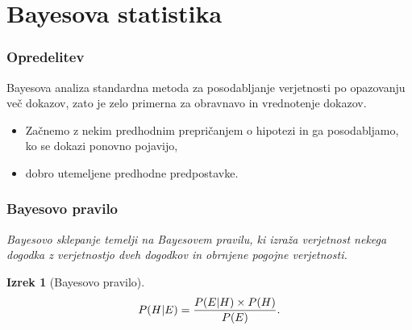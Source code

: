 \documentclass{beamer}
\newtheorem{izrek}{Izrek}
\begin{document}
\section{Bayesova statistika}

\begin{frame}
   \frametitle{Opredelitev}
   \begin{beamerboxesrounded}[]{Bayesova analiza}
      standardna metoda za posodabljanje verjetnosti po opazovanju več dokazov, zato je zelo primerna za obravnavo in vrednotenje 
      dokazov.
   \end{beamerboxesrounded} \vspace{3mm}
   \begin{itemize}
      \item Začnemo z nekim predhodnim prepričanjem o hipotezi in ga posodabljamo, ko se dokazi ponovno pojavijo,
      \item dobro utemeljene predhodne predpostavke.
   \end{itemize}

\end{frame}

\begin{frame}
   \frametitle{Bayesovo pravilo}
   \textit{
      Bayesovo sklepanje temelji na Bayesovem pravilu, ki izraža verjetnost nekega dogodka z verjetnostjo dveh dogodkov in obrnjene pogojne verjetnosti.
      \vspace{5mm}
   }
   \begin{izrek}[Bayesovo pravilo]
      \[
         P(H \lvert E) = \frac{P(E \lvert H) \times P(H)}{P(E)}. \vspace{2mm}
      \]
  \end{izrek}

\end{frame}
\end{document}
